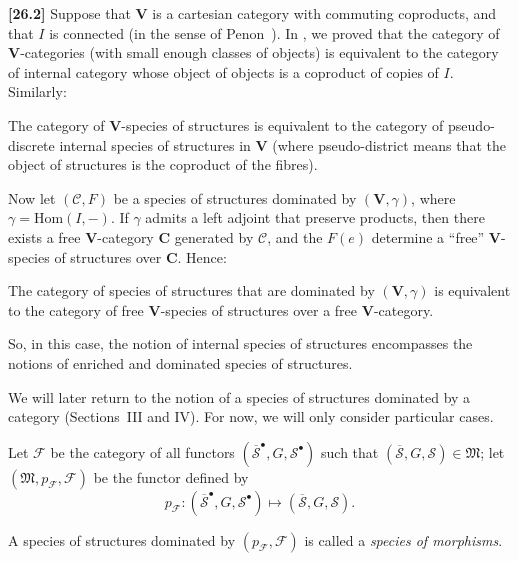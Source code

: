 \documentclass[a4paper,fleqn]{article}
\theoremstyle{plain}
\newenvironment{proposition}[1]
  {\renewcommand\theinnerproposition{#1}\innerproposition}
  {\endinnerproposition}
\theoremstyle{definition}
\newenvironment{definition}[1]
  {\renewcommand\theinnerdefinition{#1}\innerdefinition}
  {\endinnerdefinition}
\newenvironment{longcomm}[1]
  {\noindent\textbf{[#1]}\rmfamily}
  {}
\newcommand{\CC}{\mathcal{C}}
\renewcommand{\SS}{\mathcal{S}}
\newcommand{\bSS}{\overline{\SS}}
\newcommand{\MM}{\mathfrak{M}}
\newcommand{\FF}{\mathcal{F}}
\newcommand{\Hom}{\mathrm{Hom}}
\begin{document}
\begin{longcomm}{26.2}
  Suppose that $\mathbf{V}$ is a cartesian category with commuting coproducts, and that $I$ is connected (in the sense of Penon~\cite{comm83}).
  In \cite[Appendix]{coll120}, we proved that the category of $\mathbf{V}$-categories (with small enough classes of objects) is equivalent to the category of internal category whose object of objects is a coproduct of copies of $I$.
  Similarly:

  \begin{proposition}{A}
    The category of $\mathbf{V}$-species of structures is equivalent to the category of pseudo-discrete internal species of structures in $\mathbf{V}$ (where pseudo-district means that the object of structures is the coproduct of the fibres).
  \end{proposition}

  Now let $(\CC,F)$ be a species of structures dominated by $(\mathbf{V},\gamma)$, where $\gamma=\Hom(I,-)$.
  If $\gamma$ admits a left adjoint that preserve products, then there exists a free $\mathbf{V}$-category $\mathbf{C}$ generated by $\CC$, and the $F(e)$ determine a ``free'' $\mathbf{V}$-species of structures over $\mathbf{C}$.
  Hence:

  \begin{proposition}{B}
    The category of species of structures that are dominated by $(\mathbf{V},\gamma)$ is equivalent to the category of free $\mathbf{V}$-species of structures over a free $\mathbf{V}$-category.
  \end{proposition}

  So, in this case, the notion of internal species of structures encompasses the notions of enriched and dominated species of structures.
\end{longcomm}

We will later return to the notion of a species of structures dominated by a category (Sections~III and IV).
For now, we will only consider particular cases.

Let $\FF$ be the category of all functors $(\bSS^\bullet,G,\SS^\bullet)$ such that $(\bSS,G,\SS)\in\MM$;
let $(\MM,p_\FF,\FF)$ be the functor defined by
\[
  p_\FF\colon(\bSS^\bullet,G,\SS^\bullet)
  \longmapsto (\bSS,G,\SS).
\]

\begin{definition}{4}
\label{definition:i-4}
  A species of structures dominated by $(p_\FF,\FF)$ is called a \emph{species of morphisms}.
\end{definition}
\end{document}
